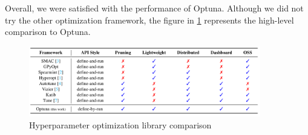 Overall, we were satisfied with the performance of Optuna. Although we did not try the other optimization framework, the figure in \ref{fig:hyperparameteropt} represents the high-level comparison to Optuna.

\begin{figure}[htbp]
    \centering
      \includegraphics[width=0.9\textwidth]{figures/HyperParam}
    \caption{Hyperparameter optimization library comparison \cite{optuna_2019}}
    \label{fig:hyperparameteropt}
\end{figure}